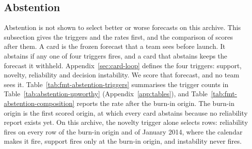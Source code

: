\subsection{Abstention}
\label{sec:abstention-results}
Abstention is not shown to select better or worse forecasts on this archive. This subsection gives the triggers and the rates first, and the comparison of scores after them. A card is the frozen forecast that a team sees before launch. It abstains if any one of four triggers fires, and a card that abstains keeps the forecast it withheld. Appendix~\ref{sec:card-loop} defines the four triggers: support, novelty, reliability and decision instability. We score that forecast, and no team sees it. Table~\ref{tab:fmt-abstention-triggers} summarises the trigger counts in Table~\ref{tab:abstention-upworthy} (Appendix~\ref{app:tables}), and Table~\ref{tab:fmt-abstention-composition} reports the rate after the burn-in origin. The burn-in origin is the first scored origin, at which every card abstains because no reliability report exists yet. On this archive, the novelty trigger alone selects rows: reliability fires on every row of the burn-in origin and of January 2014, where the calendar makes it fire, support fires only at the burn-in origin, and instability never fires.
